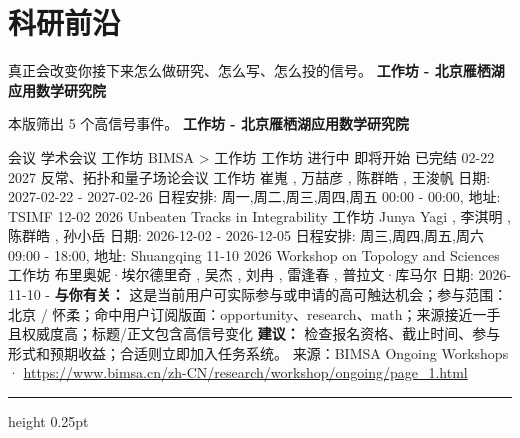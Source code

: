 \documentclass[10.5pt]{ctexart}
\begin{document}
\section*{科研前沿}
{\color{ormuted} 真正会改变你接下来怎么做研究、怎么写、怎么投的信号。}
\vspace{2mm}
{\LARGE\bfseries 工作坊 - 北京雁栖湖应用数学研究院}\par
\vspace{1mm}
{\color{ormuted} 本版筛出 5 个高信号事件。}
\vspace{3mm}
{\Large\bfseries 工作坊 - 北京雁栖湖应用数学研究院}\par
会议 学术会议 工作坊 BIMSA > 工作坊 工作坊 进行中 即将开始 已完结 02-22 2027 反常、拓扑和量子场论会议 工作坊 崔嵬 , 万喆彦 , 陈群皓 , 王浚帆 日期: 2027-02-22 - 2027-02-26 日程安排: 周一,周二,周三,周四,周五 00:00 - 00:00, 地址: TSIMF 12-02 2026 Unbeaten Tracks in Integrability 工作坊 Junya Yagi , 李淇明 , 陈群皓 , 孙小岳 日期: 2026-12-02 - 2026-12-05 日程安排: 周三,周四,周五,周六 09:00 - 18:00, 地址: Shuangqing 11-10 2026 Workshop on Topology and Sciences 工作坊 布里奥妮·埃尔德里奇 , 吴杰 , 刘冉 , 雷逢春 , 普拉文·库马尔 日期: 2026-11-10 - 
\textbf{与你有关：} 这是当前用户可实际参与或申请的高可触达机会；参与范围：北京 / 怀柔；命中用户订阅版面：opportunity、research、math；来源接近一手且权威度高；标题/正文包含高信号变化
\textbf{建议：} 检查报名资格、截止时间、参与形式和预期收益；合适则立即加入任务系统。
{\footnotesize\color{ormuted} 来源：BIMSA Ongoing Workshops · \url{https://www.bimsa.cn/zh-CN/research/workshop/ongoing/page_1.html}}
\vspace{4mm}
\hrule height 0.25pt
\vspace{3mm}
\end{document}
